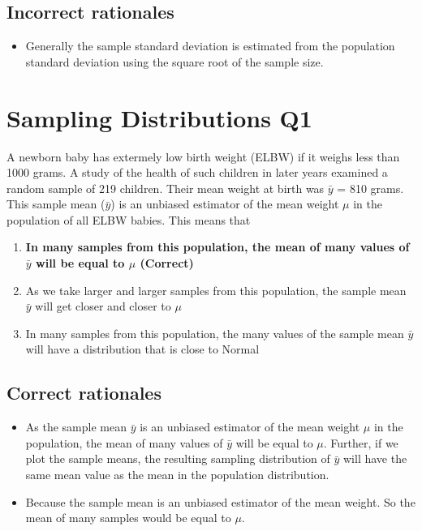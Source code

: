 \documentclass[letterpaper,9pt,twoside,printwatermark=false]{pinp}
\providecommand{\tightlist}{%
  \setlength{\itemsep}{0pt}\setlength{\parskip}{0pt}}
\begin{document}
\subsection{Incorrect rationales}\label{incorrect-rationales}

\begin{itemize}
\tightlist
\item
  Generally the sample standard deviation is estimated from the
  population standard deviation using the square root of the sample
  size.
\end{itemize}

\section{Sampling Distributions Q1}\label{sampling-distributions-q1}

A newborn baby has extermely low birth weight (ELBW) if it weighs less
than 1000 grams. A study of the health of such children in later years
examined a random sample of 219 children. Their mean weight at birth was
\(\bar{y}\) = 810 grams. This sample mean (\(\bar{y}\)) is an unbiased
estimator of the mean weight \(\mu\) in the population of all ELBW
babies. This means that

\begin{enumerate}
\def\labelenumi{\alph{enumi})}
\tightlist
\item
  \textbf{In many samples from this population, the mean of many values
  of \(\bar{y}\) will be equal to \(\mu\) (Correct)}
\item
  As we take larger and larger samples from this population, the sample
  mean \(\bar{y}\) will get closer and closer to \(\mu\)
\item
  In many samples from this population, the many values of the sample
  mean \(\bar{y}\) will have a distribution that is close to Normal
\end{enumerate}

\subsection{Correct rationales}\label{correct-rationales-1}

\begin{itemize}
\tightlist
\item
  As the sample mean \(\bar{y}\) is an unbiased estimator of the mean
  weight \(\mu\) in the population, the mean of many values of
  \(\bar{y}\) will be equal to \(\mu\). Further, if we plot the sample
  means, the resulting sampling distribution of \(\bar{y}\) will have
  the same mean value as the mean in the population distribution.
\item
  Because the sample mean is an unbiased estimator of the mean weight.
  So the mean of many samples would be equal to \(\mu\).
\end{itemize}
\end{document}
